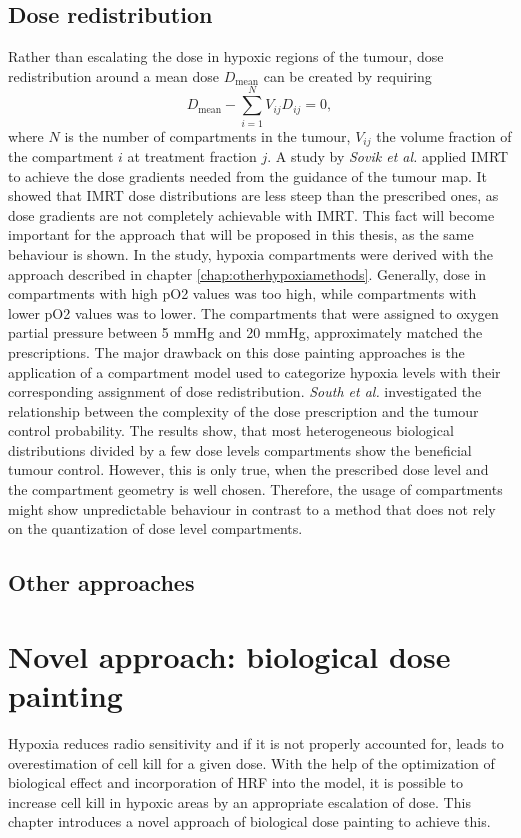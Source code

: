 \subsection{Dose redistribution}
Rather than escalating the dose in hypoxic regions of the tumour, dose redistribution around a mean dose $D_\mathrm{mean}$ can be created by requiring
\begin{equation}
D_\mathrm{mean} - \sum\limits_{i=1}^NV_{ij}D_{ij} = 0,
\end{equation}
where $N$ is the number of compartments in the tumour, $V_{ij}$ the volume fraction of the compartment $i$ at treatment fraction $j$. A study by \textit{Sovik et al.} \cite{pmid17674980} applied IMRT to achieve the dose gradients needed from the guidance of the tumour map. It showed that IMRT dose distributions are less steep than the prescribed ones, as dose gradients are not completely  achievable with IMRT. This fact will become important for the approach that will be proposed in this thesis, as the same behaviour is shown. In the study, hypoxia compartments were derived with the approach described in chapter \ref{chap:otherhypoxiamethods}. Generally, dose in compartments with high pO2 values was too high, while compartments with lower pO2 values was to lower. The compartments that were assigned to oxygen partial pressure between 5 mmHg and 20 mmHg, approximately matched the prescriptions. The major drawback on this dose painting approaches is the application of a compartment model used to categorize hypoxia levels with their corresponding assignment of dose redistribution. \textit{South et al.} \cite{pmid19928068} investigated the relationship between the complexity of the dose prescription and the tumour control probability. The results show, that most heterogeneous biological distributions divided by a few dose levels compartments show the beneficial tumour control. However, this is only true, when the prescribed dose level and the compartment geometry is well chosen. Therefore, the usage of compartments might show unpredictable behaviour in contrast to a method that does not rely on the quantization of dose level compartments.
\subsection{Other approaches}
\section{Novel approach: biological dose painting}
Hypoxia reduces radio sensitivity and if it is not properly accounted for, leads to overestimation of cell kill for a given dose. With the help of the optimization of biological effect and incorporation of HRF into the model, it is possible to increase cell kill in hypoxic areas by an appropriate escalation of dose. This chapter introduces a novel approach of biological dose painting to achieve this.
